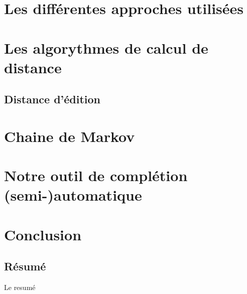 \documentclass[a4paper, 11pt]{report}
\begin{document}
\chapter{Les différentes approches utilisées}

\chapter{Les algorythmes de calcul de distance}

\section{Distance d'édition}

\chapter{Chaine de Markov}

\chapter{Notre outil de complétion (semi-)automatique}

\chapter*{Conclusion}
\newpage
\begin{center}
    \vspace*{\fill} %
    \section*{Résumé}
    \begin{justify}
Le resumé
    \end{justify}
\end{center}
\end{document}
